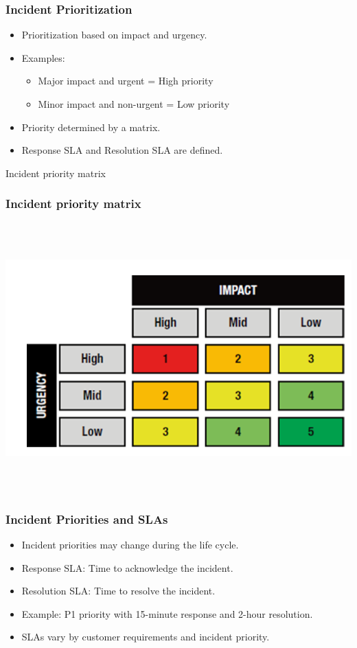 \documentclass[aspectratio=169, table]{beamer}
\begin{document}
\begin{frame}
	\frametitle{Incident Prioritization}
	\begin{itemize}
		\item Prioritization based on impact and urgency.
		\item Examples:
		\begin{itemize}
			\item Major impact and urgent = High priority
			\item Minor impact and non-urgent = Low priority
		\end{itemize}
		\item Priority determined by a matrix.
		\item Response SLA and Resolution SLA are defined.
	\end{itemize}
\end{frame}

\begin{frame}{Incident priority matrix} 	 \frametitle{ Incident priority matrix} \begin{center} 	\includegraphics[width=0.8\linewidth]{images/image-02.png} \end{center} \end{frame}

\begin{frame}
	\frametitle{Incident Priorities and SLAs}
	\begin{itemize}
		\item Incident priorities may change during the life cycle.
		\item Response SLA: Time to acknowledge the incident.
		\item Resolution SLA: Time to resolve the incident.
		\item Example: P1 priority with 15-minute response and 2-hour resolution.
		\item SLAs vary by customer requirements and incident priority.
	\end{itemize}
\end{frame}
\end{document}
